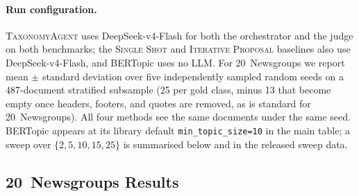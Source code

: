 \paragraph{Run configuration.}
\textsc{TaxonomyAgent} uses DeepSeek-v4-Flash for both the orchestrator
and the judge on both benchmarks; the \textsc{Single Shot} and
\textsc{Iterative Proposal} baselines also use DeepSeek-v4-Flash, and
BERTopic uses no LLM. For 20~Newsgroups we report mean $\pm$ standard
deviation over five independently sampled random seeds on a
487-document stratified subsample (25 per gold class, minus 13 that
become empty once headers, footers, and quotes are removed, as is
standard for 20~Newsgroups). All four methods see the same documents
under the same seed. BERTopic appears at its library default \texttt{min\_topic\_size=10}
in the main table; a sweep over $\{2,5,10,15,25\}$ is summarised below
and in the released sweep data.

\subsection{20~Newsgroups Results}
\label{sec:eval-results-20ng}

